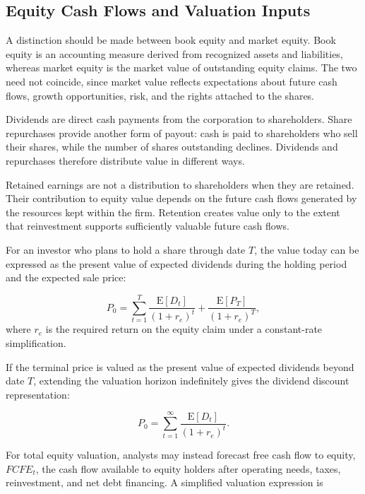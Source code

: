 \subsection{Equity Cash Flows and Valuation Inputs}

A distinction should be made between book equity and
market equity. Book equity is an accounting measure
derived from recognized assets and liabilities,
whereas market equity is the market value of
outstanding equity claims. The two need not coincide,
since market value reflects expectations about future
cash flows, growth opportunities, risk, and the rights
attached to the shares.

Dividends are direct cash payments from the corporation to shareholders. Share repurchases provide another form of payout: cash is paid to shareholders who sell their shares, while the number of shares outstanding declines. Dividends and repurchases therefore distribute value in different ways.

Retained earnings are not a distribution to shareholders when they are retained. Their contribution to equity value depends on the future cash flows generated by the resources kept within the firm. Retention creates value only to the extent that reinvestment supports sufficiently valuable future cash flows.

For an investor who plans to hold a share through date \(T\), the value today can be expressed as the present value of expected dividends during the holding period and the expected sale price:

\begin{equation}
P_0
=
\sum_{t=1}^{T}
\frac{\mathrm{E}[D_t]}{(1+r_e)^t}
+
\frac{\mathrm{E}[P_T]}{(1+r_e)^T},
\label{eq:ch9-finite-horizon-equity-value}
\end{equation}
where \(r_e\) is the required return on the equity claim under a constant-rate simplification.

If the terminal price is valued as the present value
of expected dividends beyond date $T$, extending
the valuation horizon indefinitely gives the
dividend discount representation:

\begin{equation}
P_0
=
\sum_{t=1}^{\infty}
\frac{\mathrm{E}[D_t]}{(1+r_e)^t}.
\label{eq:ch9-dividend-discount-model}
\end{equation}


For total equity valuation, analysts may instead forecast free cash flow to equity, \(FCFE_t\), the cash flow available to equity holders after operating needs, taxes, reinvestment, and net debt financing. A simplified valuation expression is

